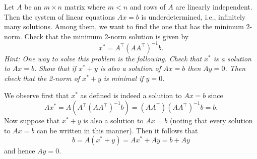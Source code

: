 \documentclass{../../../kin_math}
\begin{document}
\begin{questions}
  \question Let $A$ be an $m \times n$ matrix where $m < n$ and rows of $A$ are linearly independent. Then the system of linear equations $Ax = b$ is underdetermined, i.e., infinitely many solutions. Among them, we want to find the one that has the minimum 2-norm. Check that the minimum 2-norm solution is given by
  \begin{equation*}
    x^* = A^\top (A A^\top)^{-1} b.
  \end{equation*}
  \emph{Hint: One way to solve this problem is the following. Check that $x^*$ is a solution to $Ax = b$. Show that if $x^* + y$ is also a solution of $Ax = b$ then $Ay = 0$. Then check that the 2-norm of $x^* + y$ is minimal if $y = 0$.}
  \begin{solution}
    We observe first that $x^*$ as defined is indeed a solution to $Ax = b$ since
    \begin{equation*}
      Ax^* = A(A^\top (A A^\top)^{-1} b) = (AA^\top)(AA^\top)^{-1} b = b.
    \end{equation*}
    Now suppose that $x^* + y$ is also a solution to $Ax = b$ (noting that every solution to $Ax = b$ can be written in this manner). Then it follows that
    \begin{equation*}
      b = A(x^* + y) = Ax^* + Ay = b + Ay
    \end{equation*}
    and hence $Ay = 0$.


\end{solution}
\end{questions}
\end{document}
